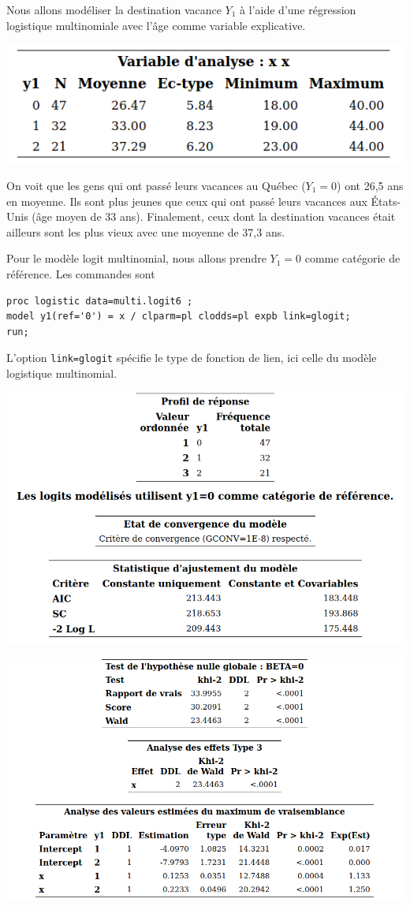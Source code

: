 \documentclass[
  11pt,
  letterpaper,
]{book}
\theoremstyle{definition}
\theoremstyle{definition}
\theoremstyle{definition}
\theoremstyle{remark}
\begin{document}
Nous allons modéliser la destination vacance \(Y_1\) à l'aide d'une régression logistique multinomiale avec l'âge comme variable explicative.

\begin{center}\includegraphics[width=0.5\linewidth]{figures/03-logistic-e31} \end{center}

On voit que les gens qui ont passé leurs vacances au Québec (\(Y_1=0\)) ont 26,5 ans en moyenne. Ils sont plus jeunes que ceux qui ont passé leurs vacances aux États-Unis (âge moyen de 33 ans). Finalement, ceux dont la destination vacances était ailleurs sont les plus vieux avec une moyenne de 37,3 ans.

Pour le modèle logit multinomial, nous allons prendre \(Y_1=0\) comme catégorie de référence. Les commandes sont

\begin{verbatim}
proc logistic data=multi.logit6 ;
model y1(ref='0') = x / clparm=pl clodds=pl expb link=glogit;
run; 
\end{verbatim}

L'option \texttt{link=glogit} spécifie le type de fonction de lien, ici celle du modèle logistique multinomial.

\begin{center}\includegraphics[width=0.75\linewidth]{figures/03-logistic-e23} \end{center}

\begin{center}\includegraphics[width=0.8\linewidth]{figures/03-logistic-e24} \end{center}
\end{document}
